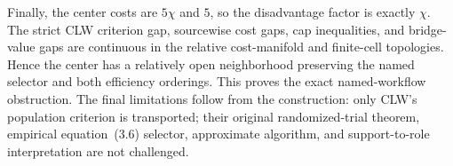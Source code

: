 Finally, the center costs are \(5\chi\) and \(5\), so the disadvantage factor is exactly \(\chi\). The strict CLW criterion gap, sourcewise cost gaps, cap inequalities, and bridge-value gaps are continuous in the relative cost-manifold and finite-cell topologies. Hence the center has a relatively open neighborhood preserving the named selector and both efficiency orderings. This proves the exact named-workflow obstruction. The final limitations follow from the construction: only CLW's population criterion is transported; their original randomized-trial theorem, empirical equation~(3.6) selector, approximate algorithm, and support-to-role interpretation are not challenged.